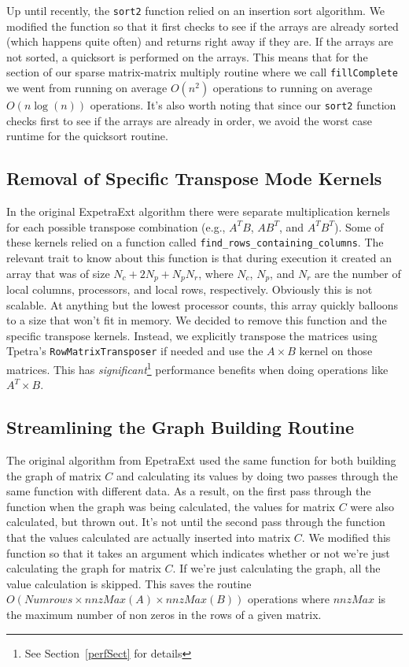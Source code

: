 \documentclass[pdf,12pt]{SANDreport}
\begin{document}
Up until recently, the \verb!sort2! function relied on an insertion sort algorithm. We modified the function so that it 
first checks to see if the arrays are already sorted (which happens quite often) and returns right away if they are. 
If the arrays are not sorted, a quicksort is performed on the arrays. This means that for the section of our sparse
matrix-matrix multiply routine where we call \verb!fillComplete! we went from running on average $O(n^2)$ operations to 
running on average $O(n \log(n))$ operations.
It's also worth noting that since our \verb!sort2! function checks first to see if the arrays are already in order, we 
avoid the worst case runtime for the quicksort routine.

\subsection{Removal of Specific Transpose Mode Kernels}
In the original ExpetraExt algorithm there were separate multiplication kernels for each possible transpose combination 
(e.g., $A^TB$, $AB^T$, and $A^TB^T$).
Some of these kernels relied on a function called \verb!find_rows_containing_columns!. The relevant trait to know about this 
function is that during execution it created an array that was of size $N_c+ 2N_p + N_p N_r$, where
$N_c$, $N_p$, and $N_r$ are the number of local columns, processors, and local rows, respectively.
Obviously this is not scalable. At anything but the lowest processor counts, this array quickly balloons to a size that 
won't fit in memory. We decided to remove this function and the specific transpose kernels. Instead, we explicitly 
transpose the matrices using Tpetra's \verb!RowMatrixTransposer! if needed
and use the $A \times B$ kernel on those matrices. This has \emph{significant}\footnote{See Section~\ref{perfSect} for 
details} performance benefits when doing operations like $A^T \times B$.

\subsection{Streamlining the Graph Building Routine}
The original algorithm from EpetraExt used the same function for both building the graph of matrix $C$ and calculating its 
values by doing two passes through the same function with different data. 
As a result, on the first pass through the function when the graph was being calculated, the values for matrix $C$ were also 
calculated, but thrown out. It's not until the second pass through the function 
that the values calculated are actually inserted into matrix $C$. We modified this function so that it
takes an argument which indicates whether or not we're just calculating the graph for matrix $C$. If we're just calculating 
the graph, all the value calculation is skipped. This saves the routine 
$O(Numrows \times {nnzMax}(A) \times {nnzMax}(B))$ operations where $nnzMax$ is the maximum number of non zeros in the rows 
of a given matrix.
\end{document}
